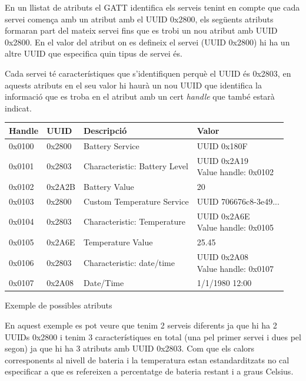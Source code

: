 En un llistat de atributs el GATT identifica els serveis tenint en compte que cada servei comença amb un atribut amb el UUID 0x2800, els següents atributs formaran part del mateix servei fins que es trobi un nou atribut amb UUID 0x2800. En el valor del atribut on es defineix el servei (UUID 0x2800) hi ha un altre UUID que especifica quin tipus de servei és.

Cada servei té característiques \cite{characteristics} que s'identifiquen perquè el UUID és 0x2803, en aquests atributs en el seu valor hi haurà un nou UUID que identifica la informació que es troba en el atribut amb un cert \textit{handle} que també estarà indicat.

\begin{center}
	\begin{tabular}{|l|l|l|l|}
		\hline
		Handle	&	UUID	&	Descripció						&	Valor		\\ 	\hline
		0x0100	&	0x2800	&	Battery Service					&	UUID 0x180F	\\		\hline
		0x0101	&	0x2803	&	Characteristic: Battery Level	&	\parbox[t]{4cm}{UUID 0x2A19	\\ Value handle: 0x0102}	\\	\hline
		0x0102	&	0x2A2B	&	Battery Value					&	20	\\	\hline
		0x0103	&	0x2800	&	Custom Temperature Service		&	UUID 	706676c8-3e49...	\\	\hline
		0x0104	&	0x2803	&	Characteristic: Temperature		&	\parbox[t]{4cm}{UUID 0x2A6E	\\ Value handle: 0x0105}	\\		\hline
		0x0105	&	0x2A6E	&	Temperature Value				&	25.45	\\	\hline
		0x0106	&	0x2803	&	Characteristic: date/time		&	\parbox[t]{4cm}{UUID 0x2A08	\\ Value handle: 0x0107}	\\		\hline
		0x0107	&	0x2A08	&	Date/Time						&	1/1/1980 12:00	\\
		\hline
	\end{tabular}

Exemple de possibles atributs
\end{center}

En aquest exemple es pot veure que tenim 2 serveis diferents ja que hi ha 2 UUIDs 0x2800 i tenim 3 característiques en total (una pel primer servei i dues pel segon) ja que hi ha 3 atributs amb UUID 0x2803.
Com que els calors corresponents al nivell de bateria i la temperatura estan estandarditzats no cal especificar a que es refereixen a percentatge de bateria restant i a graus Celsius.

